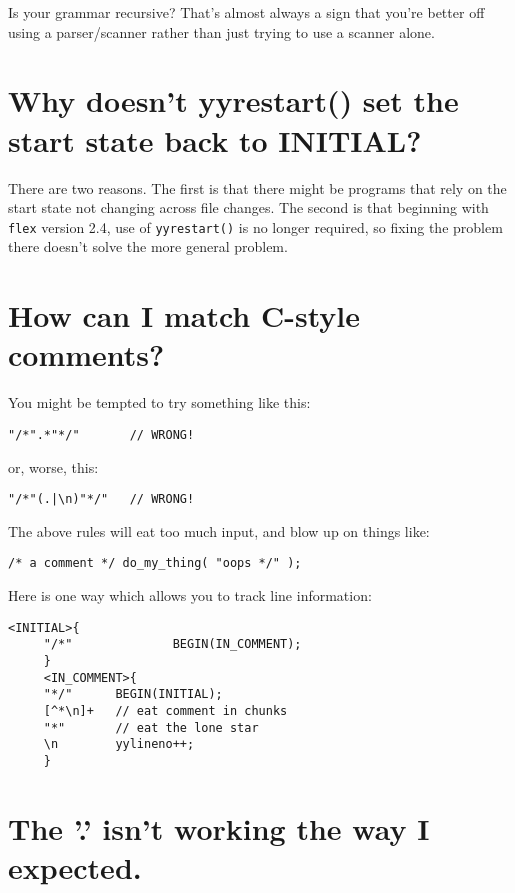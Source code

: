 \documentclass[openany,oneside]{book}
\begin{document}
Is your grammar recursive? That's almost always a sign that you're
better off using a parser/scanner rather than just trying to use a scanner
alone.
\section{Why doesn't yyrestart() set the start state back to INITIAL?}


There are two reasons.  The first is that there might
be programs that rely on the start state not changing across file changes. 
The second is that beginning with \verb`flex` version 2.4, use of \verb`yyrestart()` is no longer required,
so fixing the problem there doesn't solve the more general problem.
\section{How can I match C-style comments?}


You might be tempted to try something like this:
\begin{verbatim}
"/*".*"*/"       // WRONG!
\end{verbatim}


or, worse, this:
\begin{verbatim}
"/*"(.|\n)"*/"   // WRONG!
\end{verbatim}


The above rules will eat too much input, and blow up on things like:
\begin{verbatim}
/* a comment */ do_my_thing( "oops */" );
\end{verbatim}


Here is one way which allows you to track line information:
\begin{verbatim}
<INITIAL>{
     "/*"              BEGIN(IN_COMMENT);
     }
     <IN_COMMENT>{
     "*/"      BEGIN(INITIAL);
     [^*\n]+   // eat comment in chunks
     "*"       // eat the lone star
     \n        yylineno++;
     }
\end{verbatim}

\section{The '.' isn't working the way I expected.}
\end{document}
